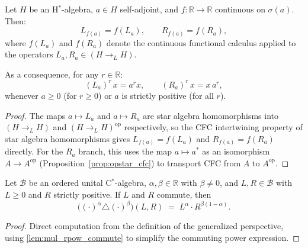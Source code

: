 \begin{proposition}
  \label{prop:mul_operators_cfc}
  \leanok
  Let $H$ be an H$^*$-algebra, $a \in H$ self-adjoint, and $f : \mathbb{R} \to \mathbb{R}$
  continuous on $\sigma(a)$. Then:
  \[
    L_{f(a)} = f(L_a), \qquad R_{f(a)} = f(R_a),
  \]
  where $f(L_a)$ and $f(R_a)$ denote the continuous functional calculus applied to
  the operators $L_a, R_a \in (H \to_L H)$.

  As a consequence, for any $r \in \mathbb{R}$:
  \[
    (L_a)^r\, x = a^r x, \qquad (R_a)^r\, x = x\, a^r,
  \]
  whenever $a \geq 0$ (for $r \geq 0$) or $a$ is strictly positive (for all $r$).
  \begin{proof}
    \leanok
    The maps $a \mapsto L_a$ and $a \mapsto R_a$ are star algebra homomorphisms into
    $(H \to_L H)$ and $(H \to_L H)^{\mathrm{op}}$ respectively, so the CFC
    intertwining property of star algebra homomorphisms gives $L_{f(a)} = f(L_a)$
    and $R_{f(a)} = f(R_a)$ directly.
    For the $R_a$ branch, this uses the map $a \mapsto a^*$ as an isomorphism
    $A \to A^{\mathrm{op}}$ (Proposition~\ref{prop:opstar_cfc}) to transport CFC from $A$ to $A^{\mathrm{op}}$.
  \end{proof}
\end{proposition}

\begin{theorem}
  \label{thm:perspective_rpow_commute}
  \leanok
  Let $\mathcal{B}$ be an ordered unital C$^*$-algebra, $\alpha, \beta \in \mathbb{R}$
  with $\beta \neq 0$, and $L, R \in \mathcal{B}$ with $L \geq 0$ and $R$ strictly positive.
  If $L$ and $R$ commute, then
  \[
    \bigl((\cdot)^\alpha \triangle (\cdot)^\beta\bigr)(L, R)
    \;=\; L^\alpha \cdot R^{\beta(1-\alpha)}.
  \]
  \begin{proof}
    \leanok
    Direct computation from the definition of the generalized perspective,
    using \ref{lem:mul_rpow_commute} to simplify the commuting power expression.
  \end{proof}
\end{theorem}
